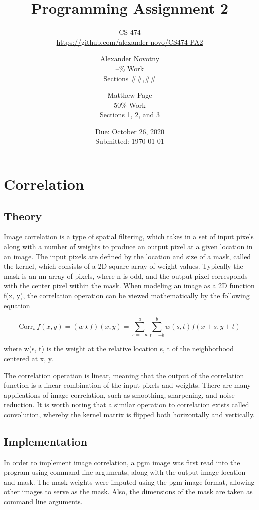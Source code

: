 \documentclass[headings=optiontoheadandtoc,listof=totoc,parskip=full]{scrartcl}
\title{Programming Assignment 2}
\subtitle{CS 474\\\url{https://github.com/alexander-novo/CS474-PA2}}
\author{Alexander Novotny\\--\% Work\\Sections \#\#,\#\# \and Matthew Page\\50\% Work\\Sections 1, 2, and 3}
\date{Due: October 26, 2020 \\ Submitted: \today}
\begin{document}
\maketitle
\tableofcontents
{}

\newpage
{}

\section{Correlation}
\label{sec:correlation}

\subsection{Theory}

Image correlation is a type of spatial filtering, which takes in a set of input pixels along with a number of weights to produce an output pixel at a given location in an image. The input pixels are defined by the location and size of a mask, called the kernel, which consists of a 2D square array of weight values. Typically the mask is an nn array of pixels, where n is odd, and the output pixel corresponds with the center pixel within the mask. When modeling an image as a 2D function f(x, y), the correlation operation can be viewed mathematically by the following equation

\[\text{Corr}_w f(x, y) = (w \star f)(x, y) = \sum_{s=-a}^a \sum_{t=-b}^b w(s, t) f(x+s, y+t)\]

where w(s, t) is the weight at the relative location s, t of the neighborhood centered at x, y.

The correlation operation is linear, meaning that the output of the correlation function is a linear combination of the input pixels and weights. There are many applications of image correlation, such as smoothing, sharpening, and noise reduction. It is worth noting that a similar operation to correlation exists called convolution, whereby the kernel matrix is flipped both horizontally and vertically. 


\subsection{Implementation}

In order to implement image correlation, a pgm image was first read into the program using command line arguments, along with the output image location and mask. The mask weights were imputed using the pgm image format, allowing other images to serve as the mask. Also, the dimensions of the mask are taken as command line arguments. 
\end{document}
